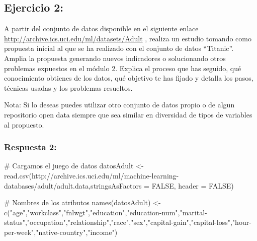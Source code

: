 \documentclass[]{article}
\newenvironment{Shaded}{\begin{snugshade}}{\end{snugshade}}
\newcommand{\CommentTok}[1]{\textcolor[rgb]{0.50,0.62,0.50}{#1}}
\newcommand{\DataTypeTok}[1]{\textcolor[rgb]{0.87,0.87,0.75}{#1}}
\newcommand{\KeywordTok}[1]{\textcolor[rgb]{0.94,0.87,0.69}{#1}}
\newcommand{\NormalTok}[1]{\textcolor[rgb]{0.80,0.80,0.80}{#1}}
\newcommand{\OtherTok}[1]{\textcolor[rgb]{0.94,0.94,0.56}{#1}}
\newcommand{\StringTok}[1]{\textcolor[rgb]{0.80,0.58,0.58}{#1}}
\begin{document}
\hypertarget{ejercicio-2}{%
\subsection{Ejercicio 2:}\label{ejercicio-2}}

A partir del conjunto de datos disponible en el siguiente enlace
\url{http://archive.ics.uci.edu/ml/datasets/Adult} , realiza un estudio
tomando como propuesta inicial al que se ha realizado con el conjunto de
datos ``Titanic''. Amplia la propuesta generando nuevos indicadores o
solucionando otros problemas expuestos en el módulo 2. Explica el
proceso que has seguido, qué conocimiento obtienes de los datos, qué
objetivo te has fijado y detalla los pasos, técnicas usadas y los
problemas resueltos.

Nota: Si lo deseas puedes utilizar otro conjunto de datos propio o de
algun repositorio open data siempre que sea similar en diversidad de
tipos de variables al propuesto.

\hypertarget{respuesta-2}{%
\subsubsection{Respuesta 2:}\label{respuesta-2}}

\begin{Shaded}
\begin{Highlighting}[]
\CommentTok{\# Cargamos el juego de datos}
\NormalTok{datosAdult \textless{}{-}}\StringTok{ }\KeywordTok{read.csv}\NormalTok{(}\StringTok{\textquotesingle{}http://archive.ics.uci.edu/ml/machine{-}learning{-}databases/adult/adult.data\textquotesingle{}}\NormalTok{,}\DataTypeTok{stringsAsFactors =} \OtherTok{FALSE}\NormalTok{, }\DataTypeTok{header =} \OtherTok{FALSE}\NormalTok{)}

\CommentTok{\# Nombres de los atributos}
\KeywordTok{names}\NormalTok{(datosAdult) \textless{}{-}}\StringTok{ }\KeywordTok{c}\NormalTok{(}\StringTok{"age"}\NormalTok{,}\StringTok{"workclass"}\NormalTok{,}\StringTok{"fnlwgt"}\NormalTok{,}\StringTok{"education"}\NormalTok{,}\StringTok{"education{-}num"}\NormalTok{,}\StringTok{"marital{-}status"}\NormalTok{,}\StringTok{"occupation"}\NormalTok{,}\StringTok{"relationship"}\NormalTok{,}\StringTok{"race"}\NormalTok{,}\StringTok{"sex"}\NormalTok{,}\StringTok{"capital{-}gain"}\NormalTok{,}\StringTok{"capital{-}loss"}\NormalTok{,}\StringTok{"hour{-}per{-}week"}\NormalTok{,}\StringTok{"native{-}country"}\NormalTok{,}\StringTok{"income"}\NormalTok{)}
\end{Highlighting}
\end{Shaded}
\end{document}
